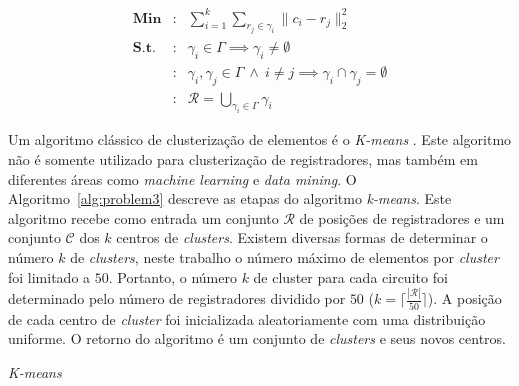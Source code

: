 \begin{eqnarray}
\label{eq:register_clustering}
    \textbf{Min}&:& \sum_{i = 1}^{k}\sum_{r_j \in \gamma_i} \lVert c_i - r_j\rVert_2^2 \\
    \label{eq:empty_constraint}
    \textbf{S.t.} &:& \gamma_i \in \Gamma \implies \gamma_i \neq \emptyset \\
    \label{eq:intersection_constraint}
    &:&\gamma_i, \gamma_j \in \Gamma \ \land \ i \neq j \implies \gamma_i \cap \gamma_j = \emptyset\\
    \label{eq:union_constraint}
    &:& \mathcal{R} = \bigcup_{\gamma_i \in \Gamma} \gamma_i 
\end{eqnarray}

Um algoritmo clássico de clusterização de elementos é o \textit{K-means} \cite{selim1984k}.
Este algoritmo não é somente utilizado para clusterização de registradores, mas também em diferentes áreas como \textit{machine learning} e \textit{data mining}.
O Algoritmo~\ref{alg:problem3} descreve as etapas do algoritmo \textit{k-means}.
Este algoritmo recebe como entrada um conjunto $\mathcal{R}$ de posições de registradores e um conjunto $\mathcal{C}$ dos $k$ centros de \textit{clusters}.
Existem diversas formas de determinar o número $k$ de \textit{clusters}, neste trabalho o número máximo de elementos por \textit{cluster} foi limitado a $50$.
Portanto, o número $k$ de cluster para cada circuito foi determinado pelo número de registradores dividido por $50$ ($k=\lceil\frac{|\mathcal{R}|}{50}\rceil$).
A posição de cada centro de \textit{cluster} foi inicializada aleatoriamente com uma distribuição uniforme.
O retorno do algoritmo é um conjunto de \textit{clusters} e seus novos centros.

\begin{algorithm}[bht]
\LinesNumbered
  \caption{\textit{K-means}} \label{alg:problem3}
\end{algorithm}

